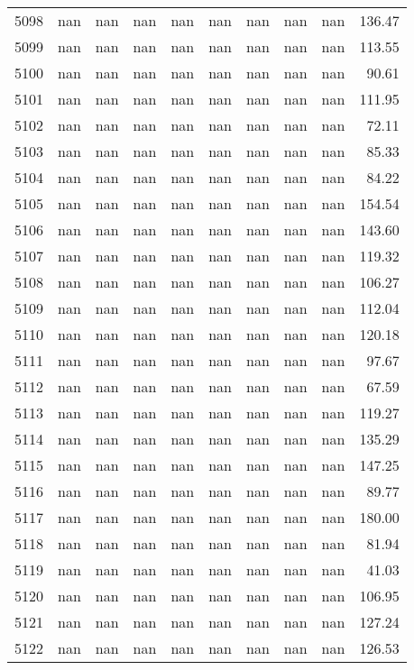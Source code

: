 \begin{tabular}{lrrrrrrrrr}
5098 & nan & nan & nan & nan & nan & nan & nan & nan & 136.47 \\
5099 & nan & nan & nan & nan & nan & nan & nan & nan & 113.55 \\
5100 & nan & nan & nan & nan & nan & nan & nan & nan & 90.61 \\
5101 & nan & nan & nan & nan & nan & nan & nan & nan & 111.95 \\
5102 & nan & nan & nan & nan & nan & nan & nan & nan & 72.11 \\
5103 & nan & nan & nan & nan & nan & nan & nan & nan & 85.33 \\
5104 & nan & nan & nan & nan & nan & nan & nan & nan & 84.22 \\
5105 & nan & nan & nan & nan & nan & nan & nan & nan & 154.54 \\
5106 & nan & nan & nan & nan & nan & nan & nan & nan & 143.60 \\
5107 & nan & nan & nan & nan & nan & nan & nan & nan & 119.32 \\
5108 & nan & nan & nan & nan & nan & nan & nan & nan & 106.27 \\
5109 & nan & nan & nan & nan & nan & nan & nan & nan & 112.04 \\
5110 & nan & nan & nan & nan & nan & nan & nan & nan & 120.18 \\
5111 & nan & nan & nan & nan & nan & nan & nan & nan & 97.67 \\
5112 & nan & nan & nan & nan & nan & nan & nan & nan & 67.59 \\
5113 & nan & nan & nan & nan & nan & nan & nan & nan & 119.27 \\
5114 & nan & nan & nan & nan & nan & nan & nan & nan & 135.29 \\
5115 & nan & nan & nan & nan & nan & nan & nan & nan & 147.25 \\
5116 & nan & nan & nan & nan & nan & nan & nan & nan & 89.77 \\
5117 & nan & nan & nan & nan & nan & nan & nan & nan & 180.00 \\
5118 & nan & nan & nan & nan & nan & nan & nan & nan & 81.94 \\
5119 & nan & nan & nan & nan & nan & nan & nan & nan & 41.03 \\
5120 & nan & nan & nan & nan & nan & nan & nan & nan & 106.95 \\
5121 & nan & nan & nan & nan & nan & nan & nan & nan & 127.24 \\
5122 & nan & nan & nan & nan & nan & nan & nan & nan & 126.53 \\

\end{tabular}
